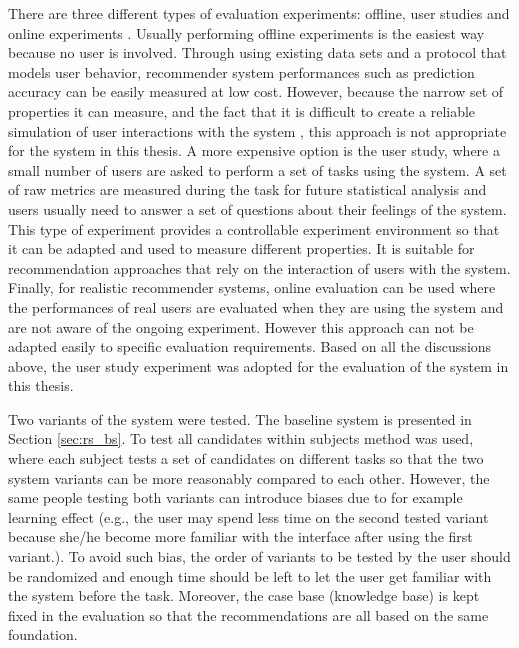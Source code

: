 There are three different types of evaluation experiments: offline, user studies and online experiments \cite{ref:35}. Usually performing offline experiments is the easiest way because no user is involved. Through using existing data sets and a protocol that models user behavior, recommender system performances such as prediction accuracy can be easily measured at low cost. However, because the narrow set of properties it can measure, and the fact that it is difficult to create a reliable simulation of user interactions with the system \cite{ref:35}, this approach is not appropriate for the system in this thesis. A more expensive option is the user study, where a small number of users are asked to perform a set of tasks using the system. A set of raw metrics are measured during the task for future statistical analysis and users usually need to answer a set of questions about their feelings of the system. This type of experiment provides a controllable experiment environment so that it can be adapted and used to measure different properties. It is suitable for recommendation approaches that rely on the interaction of users with the system. Finally, for realistic recommender systems, online evaluation can be used where the performances of real users are evaluated when they are using the system and are not aware of the ongoing experiment. However this approach can not be adapted easily to specific evaluation requirements. Based on all the discussions above, the user study experiment was adopted for the evaluation of the system in this thesis.

Two variants of the system were tested. The baseline system is presented in Section \ref{sec:rs_bs}. To test all candidates within subjects method was used, where each subject tests a set of candidates on different tasks \cite{ref:36} so that the two system variants can be more reasonably compared to each other. However, the same people testing both variants can introduce biases due to for example learning effect (e.g., the user may spend less time on the second tested variant because she/he become more familiar with the interface after using the first variant.). To avoid such bias, the order of variants to be tested by the user should be randomized and enough time should be left to let the user get familiar with the system before the task. Moreover, the case base (knowledge base) is kept fixed in the evaluation so that the recommendations are all based on the same foundation.

